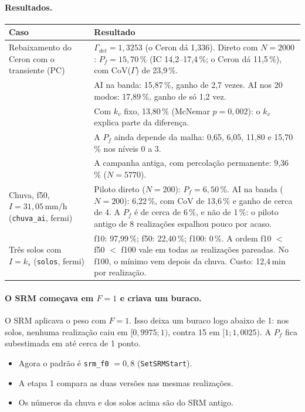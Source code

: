 \paragraph{Resultados.}
\begin{center}\small
\begin{longtable}{@{}L{4.3cm} L{11.3cm}@{}}
\toprule
Caso & Resultado \\
\midrule
\endhead
Rebaixamento do Ceron com o transiente (PC) &
  $\Gamma_{det} = 1{,}3253$ (o Ceron dá 1,336). Direto com $N = 2000$: $P_f = 15{,}70\,\%$ (IC 14,2--17,4\,\%;
  o Ceron dá 11,5\,\%), com CoV($\Gamma$) de 23,9\,\%. \\
& AI na banda: 15,87\,\%, ganho de 2,7 vezes. AI nos 20 modos: 17,89\,\%, ganho de só 1,2 vez. \\
& Com $k_v$ fixo, 13,80\,\% (McNemar $p = 0{,}002$): o $k_v$ explica parte da diferença. \\
& A $P_f$ ainda depende da malha: 0,65, 6,05, 11,80 e 15,70\,\% nos níveis 0 a 3. \\
& A campanha antiga, com percolação permanente: 9,36\,\% ($N = 5770$). \\
Chuva, f50, $I = 31{,}05$\,mm/h (\texttt{chuva\_ai}, fermi) &
  Piloto direto ($N = 200$): $P_f = 6{,}50\,\%$. AI na banda ($N = 200$): 6,22\,\%, com CoV de 13,6\,\% e ganho de cerca
  de 4. A $P_f$ é de cerca de 6\,\%, e não de 1\,\%: o piloto antigo de 8 realizações espalhou pouco por acaso. \\
Três solos com $I = k_s$ (\texttt{solos}, fermi) &
  f10: 97,99\,\%; f50: 22,40\,\%; f100: 0\,\%. A ordem f10 $<$ f50 $<$ f100 vale em todas as realizações pareadas. No f100,
  o mínimo vem depois da chuva. Custo: 12,4\,min por realização. \\
\bottomrule
\end{longtable}
\end{center}

\paragraph{O SRM começava em $F = 1$ e criava um buraco.} O SRM aplicava o peso com $F = 1$. Isso deixa um buraco logo
abaixo de 1: nos solos, nenhuma realização caiu em $[0{,}9975; 1)$, contra 15 em $[1; 1{,}0025)$. A $P_f$ fica
subestimada em até cerca de 1 ponto.
\begin{itemize}
  \item Agora o padrão é \texttt{srm\_f0} $= 0{,}8$ (\texttt{SetSRMStart}).
  \item A etapa 1 compara as duas versões nas mesmas realizações.
  \item Os números da chuva e dos solos acima são do SRM antigo.
\end{itemize}

